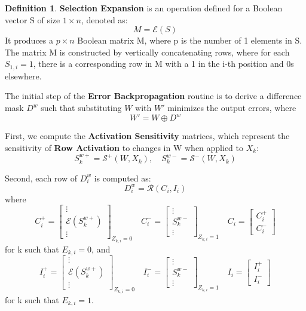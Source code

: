 \documentclass{article}
\theoremstyle{definition}
\newtheorem*{definition}{Definition}
\theoremstyle{remark}
\begin{document}
\begin{definition}
    \textbf{Selection Expansion} is an operation defined for a Boolean vector S of size \( 1 \times n \), denoted as:
    \[
        M = \mathcal{E}(S)
    \]
    It produces a \(p \times n \) Boolean matrix M, where p is the number of 1 elements in S. The matrix M is constructed by vertically concatenating rows, where for each \( S_{1,i} = 1 \), there is a corresponding row in M with a 1 in the i-th position and 0s elsewhere.
\end{definition}

The initial step of the \textbf{Error Backpropagation} routine is to derive a difference mask \( D^w \) such that substituting \( W \) with \( W' \) minimizes the output errors, where
\[
    W' = W \oplus D^w
\]

First, we compute the \textbf{Activation Sensitivity} matrices, which represent the sensitivity of \textbf{Row Activation} to changes in W when applied to \( X_k \):
\[
    S^{w+}_k = \mathcal{S^+}(W, X_k),\quad
    S^{w-}_k = \mathcal{S^-}(W, X_k)
\]

Second, each row of \( D^w_i \) is computed as:
\[
    D^w_i = \mathcal{R}(C_i, I_i)
\]
where
\[
    C^+_i = \begin{bmatrix} \vdots \\ \mathcal{E}(S^{w+}_k) \\ \vdots \end{bmatrix}_{Z_{k,i} = 0} \quad
    C^-_i = \begin{bmatrix} \vdots \\ S^{w-}_k \\ \vdots \end{bmatrix}_{Z_{k,i} = 1} \quad
    C_i = \begin{bmatrix} C^+_i \\ C^-_i \end{bmatrix}
\]
for k such that \( E_{k,i} = 0 \), and
\[
    I^+_i = \begin{bmatrix} \vdots \\ \mathcal{E}(S^{w+}_k) \\ \vdots \end{bmatrix}_{Z_{k,i} = 0} \quad
    I^-_i = \begin{bmatrix} \vdots \\ S^{w-}_k \\ \vdots \end{bmatrix}_{Z_{k,i} = 1} \quad
    I_i = \begin{bmatrix} I^+_i \\ I^-_i \end{bmatrix}
\]
for k such that \( E_{k,i} = 1 \).
\end{document}
